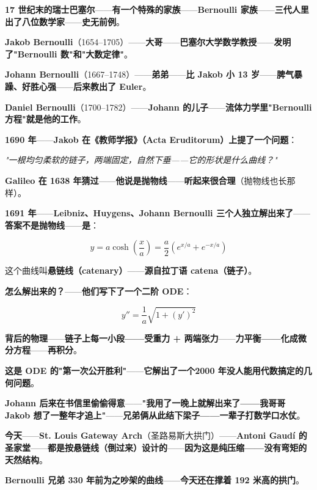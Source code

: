 \begin{tcolorbox}[storybox={\Large 小故事：Bernoulli 一家与悬链线之争}]
\textbf{17 世纪末的瑞士巴塞尔}——\textbf{有一个特殊的家族}——\textbf{Bernoulli 家族}——\textbf{三代人里出了八位数学家}——\textbf{史无前例}。

\medskip

\textbf{Jakob Bernoulli}（1654--1705）——\textbf{大哥}——\textbf{巴塞尔大学数学教授}——\textbf{发明了"Bernoulli 数"和"大数定律"}。

\textbf{Johann Bernoulli}（1667--1748）——\textbf{弟弟}——\textbf{比 Jakob 小 13 岁}——\textbf{脾气暴躁、好胜心强}——\textbf{后来教出了 Euler}。

\textbf{Daniel Bernoulli}（1700--1782）——\textbf{Johann 的儿子}——\textbf{流体力学里"Bernoulli 方程"就是他的工作}。

\medskip

\textbf{1690 年}——\textbf{Jakob 在《教师学报》（Acta Eruditorum）上提了一个问题}：

\medskip

\centerline{\itshape "一根均匀柔软的链子，两端固定，自然下垂——它的形状是什么曲线？"}

\medskip

\textbf{Galileo 在 1638 年猜过}——\textbf{他说是\textbf{抛物线}}——\textbf{听起来很合理}（抛物线也长那样）。

\medskip

\textbf{1691 年}——\textbf{Leibniz、Huygens、Johann Bernoulli 三个人独立解出来了}——\textbf{答案不是抛物线}——\textbf{是}：

\[
y = a \cosh\!\left(\frac{x}{a}\right) = \frac{a}{2}\left(e^{x/a} + e^{-x/a}\right)
\]

\medskip

这个曲线叫\textbf{悬链线（catenary）}——\textbf{源自拉丁语 catena（链子）}。

\medskip

\textbf{怎么解出来的？}——\textbf{他们写下了一个二阶 ODE}：

\[
y'' = \frac{1}{a}\sqrt{1 + (y')^2}
\]

\textbf{背后的物理}——\textbf{链子上每一小段——受重力 + 两端张力}——\textbf{力平衡——化成微分方程}——\textbf{再积分}。

\medskip

\textbf{这是 ODE 的"第一次公开胜利"}——\textbf{它解出了一个\textbf{2000 年没人能用代数搞定的几何问题}}。

\medskip

\textbf{Johann 后来在书信里偷偷得意}——\textbf{"我用了\textbf{一晚上}就解出来了——我哥哥 Jakob 想了\textbf{一整年}才追上"}——\textbf{兄弟俩从此结下梁子——一辈子打数学口水仗}。

\medskip

\textbf{今天}——\textbf{St. Louis Gateway Arch}（圣路易斯大拱门）——\textbf{Antoni Gaud{\'i} 的圣家堂}——\textbf{都是按悬链线（倒过来）设计的}——\textbf{因为这是\textbf{纯压缩——没有弯矩}的天然结构}。

\medskip

\textbf{Bernoulli 兄弟 330 年前为之吵架的曲线}——\textbf{今天还在撑着 192 米高的拱门}。
\end{tcolorbox}

